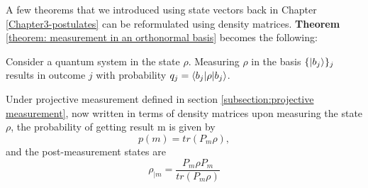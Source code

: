 A few theorems that we introduced using state vectors back in Chapter \ref{Chapter3-postulates} can be reformulated using density matrices.
\textbf{Theorem} \ref{theorem: measurement in an orthonormal basis} becomes the following:
\begin{theorem} 
Consider a quantum system in the state $\rho$. Measuring $\rho$ in the basis $\{\ket{b_j}\}_j$ results in outcome $j$ with probability $q_j=\braket{b_j | \rho |b_j}$.
\end{theorem}

\bigskip
Under projective measurement defined in section \ref{subsection:projective measurement}, now written in terms of density matrices upon measuring the state $\rho$, the probability of getting result m is given by
\begin{equation}
    p(m)=tr(P_m \rho),
\end{equation}
and the post-measurement states are
\begin{equation}
    \rho_{|m}=\frac{P_m \rho P_m}{tr(P_m \rho)}
\end{equation}






